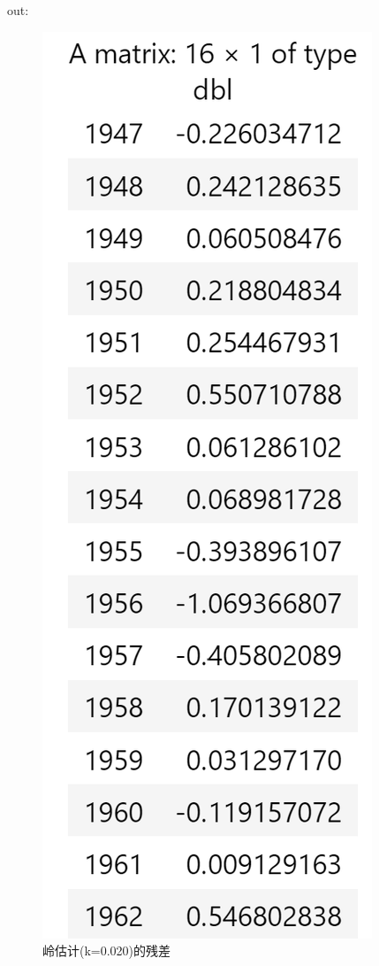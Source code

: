 \documentclass[a4paper,12pt]{article}
\begin{document}
out:
\begin{figure}[htbp]
	\centering
	\includegraphics[scale=0.5]{jietu1.png}
	\caption{岭估计(k=0.020)的残差}
\end{figure}
\end{document}
